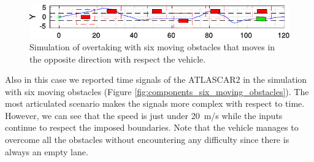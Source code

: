 \begin{figure}[h!]
\begin{minipage}[t]{\textwidth}
	\end{minipage}
	\begin{minipage}[t]{\textwidth}
		\includegraphics[width=\textwidth]{../figure/6_obstacles/6_obstacles_6.pdf}
	\end{minipage}
	\caption{Simulation of overtaking with six moving obstacles that moves in the opposite direction with respect the vehicle.}
	\label{fig:obstacleAvoidance_six_obstacles}
\end{figure}

Also in this case we reported time signals of the ATLASCAR2 in the simulation with six moving obstacles (Figure \ref{fig:components_six_moving_obstacles}). The most articulated scenario makes the signals more complex with respect to time. However, we can see that the speed is just under \SI{20}{m/s} while the inputs continue to respect the imposed boundaries. Note that the vehicle manages to overcome all the obstacles without encountering any difficulty since there is always an empty lane.
